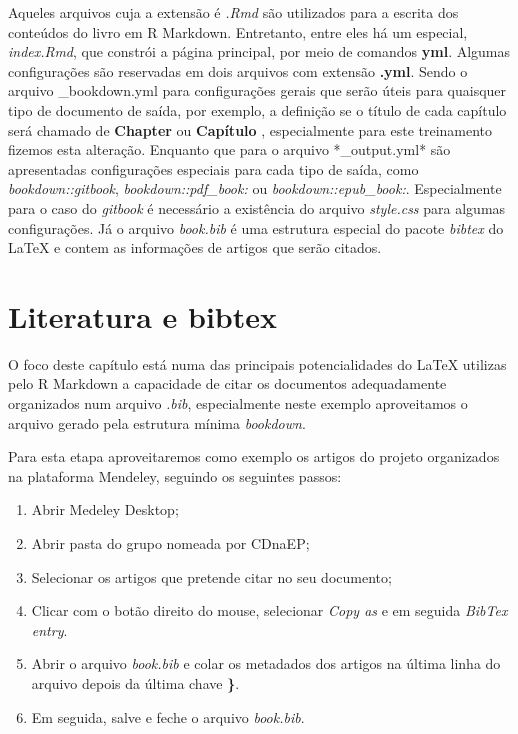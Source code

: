 \documentclass[
]{book}
\providecommand{\tightlist}{%
  \setlength{\itemsep}{0pt}\setlength{\parskip}{0pt}}
\begin{document}
Aqueles arquivos cuja a extensão é \emph{.Rmd}
são utilizados para a escrita dos
conteúdos do livro em R Markdown. Entretanto,
entre eles
há um especial, \emph{index.Rmd}, que constrói
a página principal, por meio de
comandos \textbf{yml}. Algumas configurações
são reservadas em dois arquivos com extensão
\textbf{.yml}. Sendo o arquivo \_bookdown.yml para
configurações gerais que serão úteis para quaisquer
tipo de documento de saída, por exemplo, a definição
se o título de cada capítulo será chamado de
\textbf{Chapter } ou \textbf{Capítulo }, especialmente
para este treinamento fizemos esta alteração. Enquanto
que para o arquivo *\_output.yml* são apresentadas
configurações especiais para cada tipo de saída,
como \emph{bookdown::gitbook}, \emph{bookdown::pdf\_book:} ou
\emph{bookdown::epub\_book:}. Especialmente para o
caso do \emph{gitbook} é necessário a existência do arquivo
\emph{style.css} para algumas configurações. Já o arquivo
\emph{book.bib} é uma estrutura especial do pacote \emph{bibtex}
do LaTeX e contem as informações de artigos que serão citados.

\hypertarget{literatura-e-bibtex}{%
\chapter{Literatura e bibtex}\label{literatura-e-bibtex}}

O foco deste capítulo está numa das
principais potencialidades do LaTeX
utilizas pelo R Markdown a capacidade
de citar os documentos adequadamente
organizados num arquivo \emph{.bib},
especialmente neste exemplo aproveitamos
o arquivo gerado pela estrutura mínima
\emph{bookdown}.

Para esta etapa aproveitaremos como exemplo
os artigos do projeto organizados na
plataforma Mendeley, seguindo os
seguintes passos:

\begin{enumerate}
\def\labelenumi{\arabic{enumi}.}
\tightlist
\item
  Abrir Medeley Desktop;
\item
  Abrir pasta do grupo nomeada por CDnaEP;
\item
  Selecionar os artigos que pretende citar no seu documento;
\item
  Clicar com o botão direito do mouse, selecionar \emph{Copy as} e em seguida \emph{BibTex entry}.
\item
  Abrir o arquivo \emph{book.bib} e colar os metadados
  dos artigos na última linha do arquivo depois da
  última chave \textbf{\}}.
\item
  Em seguida, salve e feche o arquivo \emph{book.bib}.
\end{enumerate}
\end{document}
